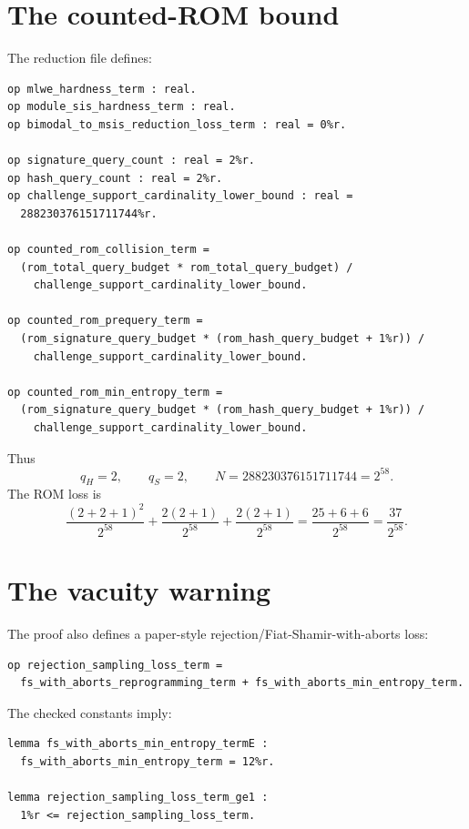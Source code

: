 \documentclass[11pt]{report}
\theoremstyle{definition}
\theoremstyle{plain}
\begin{document}
\section{The counted-ROM bound}

The reduction file defines:

\begin{lstlisting}[language=EasyCrypt]
op mlwe_hardness_term : real.
op module_sis_hardness_term : real.
op bimodal_to_msis_reduction_loss_term : real = 0%r.

op signature_query_count : real = 2%r.
op hash_query_count : real = 2%r.
op challenge_support_cardinality_lower_bound : real =
  288230376151711744%r.

op counted_rom_collision_term =
  (rom_total_query_budget * rom_total_query_budget) /
    challenge_support_cardinality_lower_bound.

op counted_rom_prequery_term =
  (rom_signature_query_budget * (rom_hash_query_budget + 1%r)) /
    challenge_support_cardinality_lower_bound.

op counted_rom_min_entropy_term =
  (rom_signature_query_budget * (rom_hash_query_budget + 1%r)) /
    challenge_support_cardinality_lower_bound.
\end{lstlisting}

Thus
\[
  q_H=2,\qquad q_S=2,\qquad N=288230376151711744=2^{58}.
\]
The ROM loss is
\[
  \frac{(2+2+1)^2}{2^{58}}
  +\frac{2(2+1)}{2^{58}}
  +\frac{2(2+1)}{2^{58}}
  =
  \frac{25+6+6}{2^{58}}
  =
  \frac{37}{2^{58}}.
\]

\section{The vacuity warning}

The proof also defines a paper-style rejection/Fiat-Shamir-with-aborts loss:

\begin{lstlisting}[language=EasyCrypt]
op rejection_sampling_loss_term =
  fs_with_aborts_reprogramming_term + fs_with_aborts_min_entropy_term.
\end{lstlisting}

The checked constants imply:

\begin{lstlisting}[language=EasyCrypt]
lemma fs_with_aborts_min_entropy_termE :
  fs_with_aborts_min_entropy_term = 12%r.

lemma rejection_sampling_loss_term_ge1 :
  1%r <= rejection_sampling_loss_term.
\end{lstlisting}
\end{document}
